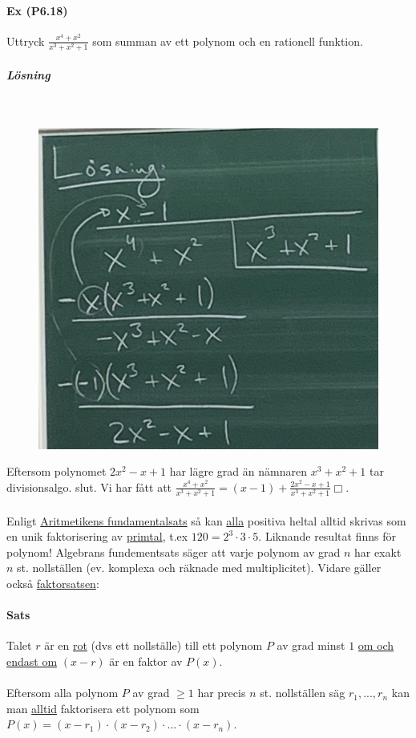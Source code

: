 \paragraph{Ex (P6.18)} Uttryck $\frac{x^4+x^2}{x^3+x^2+1}$ som summan av ett polynom och en rationell funktion.
\subparagraph{Lösning}~\\
\begin{figure}
    \vspace{-15pt}
    \includegraphics[scale=0.1]{lessons/lesson02/imgs/img01.jpg}\\
\end{figure}
Eftersom polynomet $2x^2-x+1$ har lägre grad än nämnaren $x^3+x^2+1$ tar divisionsalgo. slut.
Vi har fått att $\frac{x^4+x^2}{x^3+x^2+1}=(x-1)+\frac{2x^2-x+1}{x^3+x^2+1}\Box$.
\clearpage
\paragraph{} Enligt \underline{Aritmetikens fundamentalsats} så kan \underline{alla} positiva heltal alltid skrivas som en unik faktorisering av \underline{primtal}, t.ex $120=2^3\cdot 3\cdot 5$.
Liknande resultat finns för polynom! Algebrans fundementsats säger att varje polynom av grad $n$ har exakt $n$ st. nollställen (ev. komplexa och räknade med multiplicitet).
Vidare gäller också \underline{faktorsatsen}:
\paragraph{Sats} Talet $r$ är en \underline{rot} (dvs ett nollställe) till ett polynom $P$ av grad minst $1$ \underline{om och endast om} $(x-r)$ är en faktor av $P(x)$.
\\\\
Eftersom alla polynom $P$ av grad $\geq 1$ har precis $n$ st. nollställen säg $r_1,...,r_n$ kan man \underline{alltid} faktorisera ett polynom som $P(x)=(x-r_1)\cdot(x-r_2)\cdot ... \cdot(x-r_n)$.

